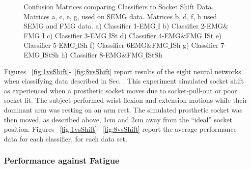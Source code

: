 \documentclass[twocolumn]{sagej}
\begin{document}
\begin{figure*}[htbp]
\centering
{}
\caption{Confusion Matrices comparing Classifiers to Socket Shift Data. Matrices a, c, e, g, used on SEMG data. Matrices b, d, f, h used SEMG and FMG data. a) Classifier 1-EMG$\_$I b) Classifier 2-EMG$\&$FMG$\_$I c) Classifier 3-EMG$\_$ISt d) Classifier 4-EMG$\&$FMG$\_$ISt e) Classifier 5-EMG$\_$ISh f) Classifier 6EMG$\&$FMG$\_$ISh g) Classifier 7-EMG$\_$IStSh h) Classifier 8-EMG$\&$FMG$\_$IStSh}

\end{figure*}

Figures ~\ref{fig:1vsShift}-~\ref{fig:8vsShift} report results of the eight neural networks when classifying data described in Sec. \textit{}.  This experiment simulated socket shift as experienced when a prosthetic socket moves due to socket-pull-out or poor socket fit.  The subject performed wrist flexion and extension motions while their dominant arm was resting on an arm rest.  The simulated prosthetic socket was then moved, as described above, 1cm and 2cm away from the ``ideal'' socket position.  Figures ~\ref{fig:1vsShift}-~\ref{fig:8vsShift} report the average performance data for each classifier, for each data set.  \par \noindent

\subsubsection*{Performance against Fatigue}
\label{sec:res_fatigue}

\begin{comment}
Data comparing different training data sets to fatigue

ideal, standing, shift -> fatigue
ideal, shift -> fatigue
ideal, standing -> fatigue
ideal -> fatigue
\end{comment}
\end{document}
